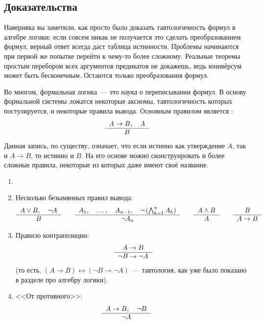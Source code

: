 \subsection{Доказательства}
\label{subsec:formal_systems:proofs}

Наверняка вы заметили, как просто было доказать тавтологичность формул в алгебре логики: если совсем никак не получается это сделать преобразованием формул,
верный ответ всегда даст таблица истинности.
Проблемы начинаются при первой же попытке перейти к чему-то более сложному.
Реальные теоремы простым перебором всех аргументов предикатов не докажешь, ведь юнивёрсум может быть бесконечным.
Остаются только преобразования формул.

Во многом, формальная логика~--- это наука о переписывании формул.
В основу формальной системы ложатся некоторые аксиомы, тавтологичность которых постулируется, и некоторые правила вывода.
Основным правилом является :
\[
    \typerule{A \rightarrow B, \quad A}{B}
\]
Данная запись, по существу, означает, что если истинно как утверждение $ A $, так и $ A \rightarrow B $, то истинно и $ B $.
На его основе можно сконструировать и более сложные правила, некоторые из которых даже имеют своё название.
\begin{example}
    \label{example:formal_systems:rules}
    \begin{enumerate}
        \item[]
        \item Несколько безымянных правил вывода:
           \[
                \typerule{A \vee B, \quad \neg A}{B} \qquad
                \typerule{A_1, \quad \ldots, \quad A_{n-1}, \quad \neg \left( \bigwedge_{k=1}^n A_k  \right)}{\neg A_n} \qquad
                \typerule{A \wedge B}{A} \qquad
                \typerule{B}{A \rightarrow B}
            \]
        \item Правило контрапозиции:
            \[
                \typerule{A \rightarrow B}{\neg B \rightarrow \neg A}
            \]
            (то есть, $ (A \rightarrow B) \leftrightarrow (\neg B \rightarrow \neg A) $~--- тавтология, как уже было показано в разделе про алгебру логики).
        \item <<От противного>>:
            \[
                \typerule{A \rightarrow B, \quad \neg B}{\neg A} \qquad
            \]
    \end{enumerate}
\end{example}

